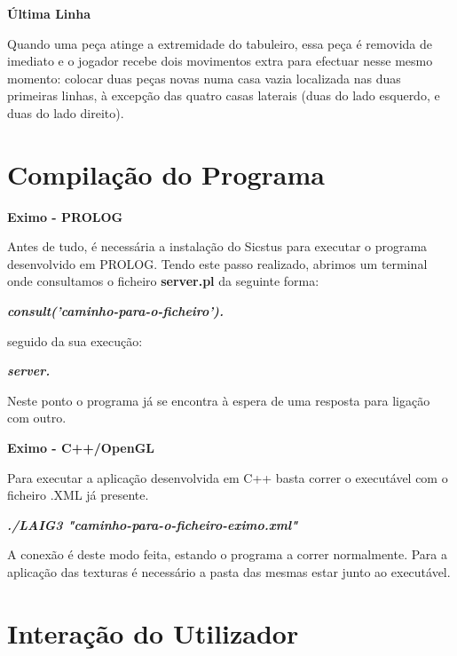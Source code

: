 \documentclass[a4paper]{article}
\begin{document}
\large{\textbf{Última Linha}}
\begin{small}

Quando uma peça atinge a extremidade do tabuleiro, essa peça é removida de imediato e o jogador recebe dois movimentos extra para efectuar nesse mesmo momento: colocar duas peças novas numa casa vazia localizada nas duas primeiras linhas, à excepção das quatro casas laterais (duas do lado esquerdo, e duas do lado direito).
\end{small}\newline


\section{Compilação do Programa}
\large{\textbf{Eximo - PROLOG}}

\begin{small}
Antes de tudo, é necessária a instalação do Sicstus para executar o programa desenvolvido em PROLOG. Tendo este passo realizado, abrimos um terminal onde consultamos o ficheiro \textbf{server.pl} da seguinte forma:

\textbf{\textit{consult('caminho-para-o-ficheiro').}}

seguido da sua execução:

\textbf{\textit{server.}}

Neste ponto o programa já se encontra à espera de uma resposta para ligação com outro.

\hfill
\end{small}

\large{\textbf{Eximo - C++/OpenGL}}

\begin{small}
Para executar a aplicação desenvolvida em C++ basta correr o executável com o ficheiro .XML já presente.

\textbf{\textit{./LAIG3 "caminho-para-o-ficheiro-eximo.xml"}}

A conexão é deste modo feita, estando o programa a correr normalmente. Para a aplicação das texturas é necessário a pasta das mesmas estar junto ao executável.
\end{small}

\section{Interação do Utilizador}
\end{document}

